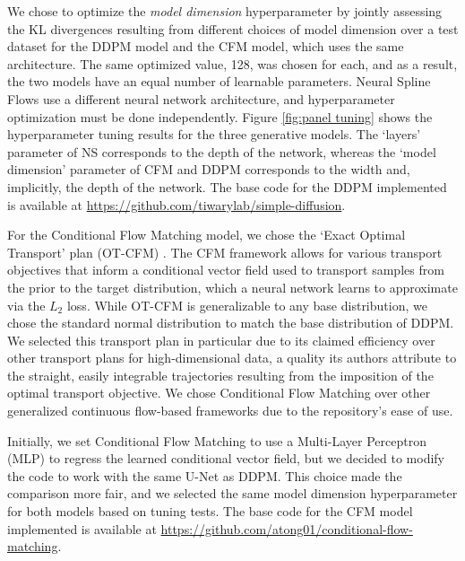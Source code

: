 \documentclass[%
 aip,
 amsmath,amssymb,
 reprint,%
]{revtex4-1}
\begin{document}
{We chose to optimize the \textit{model dimension} hyperparameter by jointly assessing the KL divergences resulting from different choices of model dimension over a test dataset for the DDPM model and the CFM model, which uses the same architecture. The same optimized value, 128, was chosen for each, and as a result, the two models have an equal number of learnable parameters. Neural Spline Flows use a different neural network architecture, and hyperparameter optimization must be done independently. Figure \ref{fig:panel tuning} shows the hyperparameter tuning results for the three generative models. The `layers' parameter of NS corresponds to the depth of the network, whereas the `model dimension' parameter of CFM and DDPM corresponds to the width and, implicitly, the depth of the network. The base code for the DDPM implemented is available at \url{https://github.com/tiwarylab/simple-diffusion}.

For the Conditional Flow Matching model, we chose the `Exact Optimal Transport' plan (OT-CFM) \cite{tong2023improving}. The CFM framework allows for various transport objectives that inform a conditional vector field used to transport samples from the prior to the target distribution, which a neural network learns to approximate via the $L_2$ loss. While OT-CFM is generalizable to any base distribution, we chose the standard normal distribution to match the base distribution of DDPM. We selected this transport plan in particular due to its claimed efficiency over other transport plans for high-dimensional data, a quality its authors attribute to the straight, easily integrable trajectories resulting from the imposition of the optimal transport objective. We chose Conditional Flow Matching over other generalized continuous flow-based frameworks due to the repository's ease of use.

Initially, we set Conditional Flow Matching to use a Multi-Layer Perceptron (MLP) to regress the learned conditional vector field, but we decided to modify the code to work with the same U-Net as DDPM. This choice made the comparison more fair, and we selected the same model dimension hyperparameter for both models based on tuning tests. The base code for the CFM model implemented is available at \url{https://github.com/atong01/conditional-flow-matching}.

}
\end{document}
